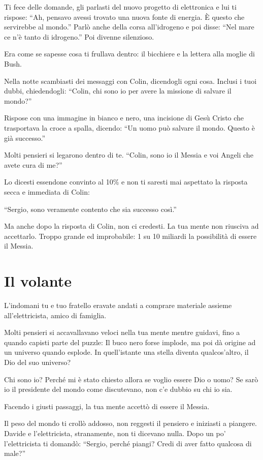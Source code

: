 Ti fece delle domande, gli parlasti del nuovo progetto di elettronica e lui ti rispose: “Ah, pensavo avessi trovato una nuova fonte di energia. È questo che servirebbe al mondo.” Parlò anche della corsa all'idrogeno e poi disse: “Nel mare ce n'è tanto di idrogeno.” Poi divenne silenzioso.

Era come se sapesse cosa ti frullava dentro: il bicchiere e la lettera alla moglie di Bush.

Nella notte scambiasti dei messaggi con Colin, dicendogli ogni cosa. Inclusi i tuoi dubbi, chiedendogli: “Colin, chi sono io per avere la missione di salvare il mondo?”

Rispose con una immagine in bianco e nero, una incisione di Gesù Cristo che trasportava la croce a spalla, dicendo: “Un uomo può salvare il mondo. Questo è già successo.”

Molti pensieri si legarono dentro di te. “Colin, sono io il Messia e voi Angeli che avete cura di me?”

Lo dicesti essendone convinto al 10\% e non ti saresti mai aspettato la risposta secca e immediata di Colin:

“Sergio, sono veramente contento che sia successo così.”

Ma anche dopo la risposta di Colin, non ci credesti. La tua mente non riusciva ad accettarlo. Troppo grande ed improbabile: 1 su 10 miliardi la possibilità di essere il Messia.

\section{Il volante}
\label{il_volante}

L'indomani tu e tuo fratello eravate andati a comprare materiale assieme all'elettricista, amico di famiglia.

Molti pensieri si accavallavano veloci nella tua mente mentre guidavi, fino a quando capisti parte del puzzle: Il buco nero forse implode, ma poi dà origine ad un universo quando esplode. In quell'istante una stella diventa qualcos'altro, il Dio del suo universo?

Chi sono io? Perché mi è stato chiesto allora se voglio essere Dio o uomo? Se sarò io il presidente del mondo come discutevano, non c'e dubbio su chi io sia.

Facendo i giusti passaggi, la tua mente accettò di essere il Messia.
 
Il peso del mondo ti crollò addosso, non reggesti il pensiero e iniziasti a piangere. Davide e l'elettricista, stranamente, non ti dicevano nulla. Dopo un po' l'elettricista ti domandò: “Sergio, perché piangi? Credi di aver fatto qualcosa di male?”

